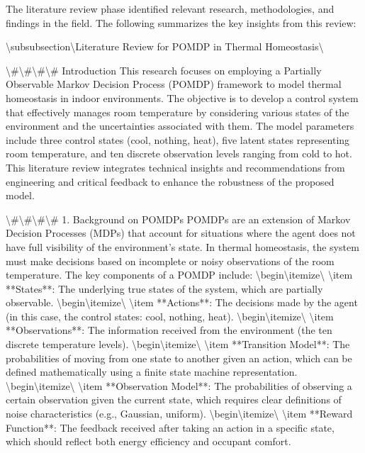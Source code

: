 \documentclass[11pt,a4paper]{article}
\begin{document}
The literature review phase identified relevant research, methodologies, and findings in the field. The following summarizes the key insights from this review:

\textbackslash{}subsubsection\textbackslash{}{Literature Review for POMDP in Thermal Homeostasis\textbackslash{}}

\textbackslash{}#\textbackslash{}#\textbackslash{}#\textbackslash{}# Introduction
This research focuses on employing a Partially Observable Markov Decision Process (POMDP) framework to model thermal homeostasis in indoor environments. The objective is to develop a control system that effectively manages room temperature by considering various states of the environment and the uncertainties associated with them. The model parameters include three control states (cool, nothing, heat), five latent states representing room temperature, and ten discrete observation levels ranging from cold to hot. This literature review integrates technical insights and recommendations from engineering and critical feedback to enhance the robustness of the proposed model.

\textbackslash{}#\textbackslash{}#\textbackslash{}#\textbackslash{}# 1. Background on POMDPs
POMDPs are an extension of Markov Decision Processes (MDPs) that account for situations where the agent does not have full visibility of the environment's state. In thermal homeostasis, the system must make decisions based on incomplete or noisy observations of the room temperature. The key components of a POMDP include:
\textbackslash{}begin\textbackslash{}{itemize\textbackslash{}}
\textbackslash{}item **States**: The underlying true states of the system, which are partially observable.
\textbackslash{}begin\textbackslash{}{itemize\textbackslash{}}
\textbackslash{}item **Actions**: The decisions made by the agent (in this case, the control states: cool, nothing, heat).
\textbackslash{}begin\textbackslash{}{itemize\textbackslash{}}
\textbackslash{}item **Observations**: The information received from the environment (the ten discrete temperature levels).
\textbackslash{}begin\textbackslash{}{itemize\textbackslash{}}
\textbackslash{}item **Transition Model**: The probabilities of moving from one state to another given an action, which can be defined mathematically using a finite state machine representation.
\textbackslash{}begin\textbackslash{}{itemize\textbackslash{}}
\textbackslash{}item **Observation Model**: The probabilities of observing a certain observation given the current state, which requires clear definitions of noise characteristics (e.g., Gaussian, uniform).
\textbackslash{}begin\textbackslash{}{itemize\textbackslash{}}
\textbackslash{}item **Reward Function**: The feedback received after taking an action in a specific state, which should reflect both energy efficiency and occupant comfort.
\end{document}
